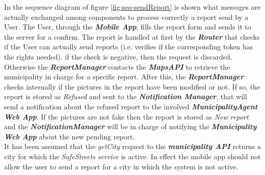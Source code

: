 \documentclass[a4paper]{report}
\begin{document}
In the sequence diagram of figure \ref{fig:seq-sendReport} is shown what messages are actually exchanged among components to process correctly a report send by a User. The User, through the \textit{\textbf{Mobile App}}, fills the report form and sends it to the server for a confirm. The report is handled at first by the \textit{\textbf{Router}} that checks if the User can actually send reports (i.e. verifies if the corresponding token has the rights needed). if the check is negative, then the request is discarded. Otherwise the \textit{\textbf{ReportManager}} contacts the \textit{\textbf{MapsAPI}} to retrieve the municipality in charge for a specific report. After this, the \textit{\textbf{ReportManager}} checks internally if the pictures in the report have been modified or not. If so, the report is stored as \textit{Refused} and sent to the \textit{\textbf{Notification Manager}}, that will send a notification about the refused report to the involved \textit{\textbf{MunicipalityAgent Web App}}. If the pictures are not fake then the report is stored as \textit{New report} and the \textit{\textbf{NotificationManager}} will be in charge of notifying the \textit{\textbf{Municipality Web App}} about the new pending report.\\
It has been assumed that the \textit{getCity} request to the \textbf{\textit{municipality API}} returns a city for which the \textit{SafeStreets service} is active. In effect the mobile app should not allow the user to send a report for a city in which the system is not active.
\\\\
\end{document}
